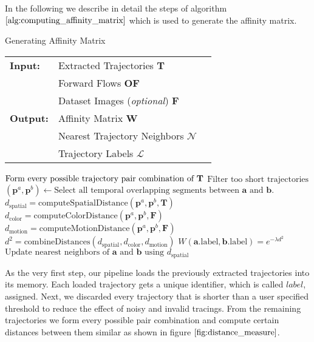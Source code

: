 In the following we describe in detail the steps of algorithm $\ref{alg:computing_affinity_matrix}$ which is used to generate the affinity matrix.
\begin{algorithm}[H]
\caption{Generating Affinity Matrix}
\begin{table}[H]
  \begin{tabular}{@{}lll@{}}
    \textbf{Input:} & Extracted Trajectories \bf{T} \\
		& Forward Flows \bf{OF} \\
 		& Dataset Images (\emph{optional}) \bf{F} \\
    \textbf{Output:} & Affinity Matrix \bf{W} \\
    & Nearest Trajectory Neighbors \bf{$\mathcal{N}$}\\
    & Trajectory Labels \bf{$\mathcal{L}$}\\
  \end{tabular} 
\end{table}
\setlength{\fboxrule}{0pt} 
\begin{boxedminipage}{1.0\textwidth}
  \begin{algorithmic}[1]
      \State $\text{Form every possible trajectory pair combination of } \bf{T}$
      \State $\text{Filter too short trajectories}$
        \State $\left( \textbf{p}^a, \textbf{p}^b \right) \longleftarrow\text{Select all temporal overlapping segments between } \textbf{a} \text{ and } \textbf{b}.$
        \State $d_{\text{spatial}} = \text{computeSpatialDistance}\left( \textbf{p}^a, \textbf{p}^b, \textbf{T} \right)$
        \State $d_{\text{color}} = \text{computeColorDistance}\left( \textbf{p}^a, \textbf{p}^b, \textbf{F} \right)$
        \State $d_{\text{motion}} = \text{computeMotionDistance}\left( \textbf{p}^a, \textbf{p}^b, \textbf{F} \right)$
        \State $d^2 = \text{combineDistances} \left( d_{\text{spatial}}, d_{\text{color}}, d_{\text{motion}} \right)$
        \State $W \left( \textbf{a}\text{.label}, \textbf{b}\text{.label} \right) = e^{-\lambda d^2}$
        \State $\text{Update nearest neighbors of } \textbf{a} \text{ and } \textbf{b} \text{ using } d_{\text{spatial}}$
      \EndFor
  \end{algorithmic}
  \end{boxedminipage}
  \vskip1.5pt
\label{alg:computing_affinity_matrix}
\end{algorithm}
As the very first step, our pipeline loads the previously extracted trajectories into its memory. Each loaded trajectory gets a unique identifier, which is called $\textit{label}$, assigned. Next, we discarded every trajectory that is shorter than a user specified threshold to reduce the effect of noisy and invalid tracings. From the remaining trajectories we form every possible pair combination and compute certain distances between them similar as shown in figure $\ref{fig:distance_measure}$.
